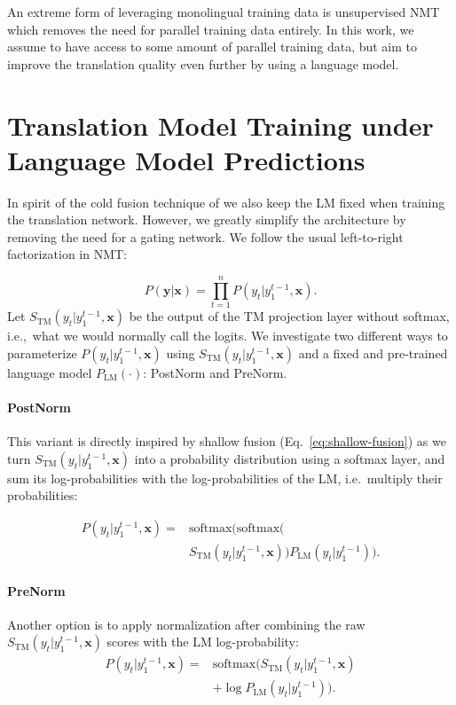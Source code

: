 \documentclass[11pt,a4paper]{article}
\begin{document}
An extreme form of leveraging monolingual training data is unsupervised NMT~\citep{unsupervised,unsupervised2} which removes the need for parallel training data entirely. In this work, we assume to have access to some amount of parallel training data, but aim to improve the translation quality even further by using a language model.

\section{Translation Model Training under Language Model Predictions}

In spirit of the cold fusion technique of \citet{coldfusion} we also keep the LM fixed when training the translation network. However, we greatly simplify the architecture by removing the need for a gating network. We follow the usual left-to-right factorization in NMT:


\begin{equation}
 P(\mathbf{y}|\mathbf{x}) = \prod_{t=1}^n  P(y_t|y_1^{t-1},\mathbf{x}).
\end{equation}
Let $S_\text{TM}(y_t|y_1^{t-1},\mathbf{x})$ be the output of the TM projection layer without softmax, i.e.,\ what we would normally call the logits. We investigate two different ways to parameterize $P(y_t|y_1^{t-1},\mathbf{x})$ using $S_\text{TM}(y_t|y_1^{t-1},\mathbf{x})$ and a fixed and pre-trained language model $P_\text{LM}(\cdot)$: {\sc PostNorm} and {\sc PreNorm}.

\paragraph{{\sc PostNorm}}
This variant is directly inspired by shallow fusion (Eq.~\ref{eq:shallow-fusion}) as we turn $S_\text{TM}(y_t|y_1^{t-1},\mathbf{x})$ into a probability distribution using a softmax layer, and sum its log-probabilities with the log-probabilities of the LM, i.e.\ multiply their probabilities:


\begin{equation}
\begin{split}
P(y_t|y_1^{t-1},\mathbf{x}) =& \text{softmax}\big(\text{softmax}( \\
&S_\text{TM}(y_t|y_1^{t-1},\mathbf{x}))P_\text{LM}(y_t|y_1^{t-1})\big).
\end{split}
\label{eq:logprob}
\end{equation}


\paragraph{{\sc PreNorm}} 
Another option is to apply normalization after combining the raw $S_\text{TM}(y_t|y_1^{t-1},\mathbf{x})$ scores with the LM log-probability:
\begin{equation}
\begin{split}
 P(y_t|y_1^{t-1},\mathbf{x}) =& \text{softmax}\Big(S_\text{TM}(y_t|y_1^{t-1},\mathbf{x}) \\
&+ \log P_\text{LM}(y_t|y_1^{t-1}) \Big).
\end{split}
\label{eq:plain}
\end{equation}
\end{document}
